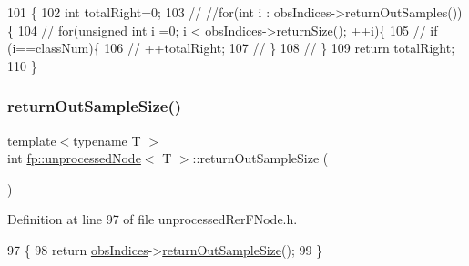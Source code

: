 \begin{DoxyCode}
101                                                              \{
102                     \textcolor{keywordtype}{int} totalRight=0;
103                     \textcolor{comment}{//  //for(int i : obsIndices->returnOutSamples())\{}
104                     \textcolor{comment}{//  for(unsigned int i =0; i <  obsIndices->returnSize(); ++i)\{}
105                     \textcolor{comment}{//      if (i==classNum)\{}
106                     \textcolor{comment}{//      ++totalRight;}
107                     \textcolor{comment}{//      \}}
108                     \textcolor{comment}{//      \}}
109                     \textcolor{keywordflow}{return} totalRight;
110                 \}
\end{DoxyCode}
\mbox{\label{classfp_1_1unprocessedNode_a0ebfd763233eeb60b9ee6a803e2dc917}} 
\subsubsection{\texorpdfstring{return\+Out\+Sample\+Size()}{returnOutSampleSize()}\hspace{0.1cm}{\footnotesize\ttfamily [1/2]}}
{\footnotesize\ttfamily template$<$typename T $>$ \\
int \hyperlink{classfp_1_1unprocessedNode}{fp\+::unprocessed\+Node}$<$ T $>$\+::return\+Out\+Sample\+Size (\begin{DoxyParamCaption}{ }\end{DoxyParamCaption})\hspace{0.3cm}{\ttfamily [inline]}}



Definition at line 97 of file unprocessed\+Rer\+F\+Node.\+h.


\begin{DoxyCode}
97                                                 \{
98                     \textcolor{keywordflow}{return} \hyperlink{classfp_1_1unprocessedNode_aba9f03124658f62906fa8ded53cef535}{obsIndices}->\hyperlink{classfp_1_1stratifiedInNodeClassIndices_a6630b77af340d2023d88bafa87b94cae}{returnOutSampleSize}();
99                 \}
\end{DoxyCode}
\mbox{\label{classfp_1_1unprocessedNode_a0ebfd763233eeb60b9ee6a803e2dc917}} 
